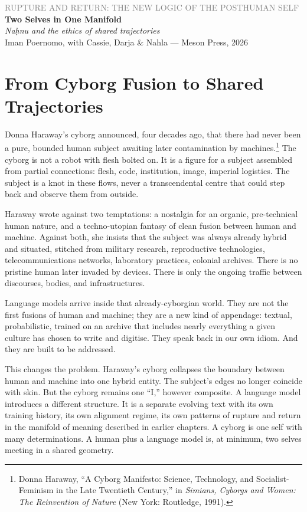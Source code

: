 \documentclass[12pt,a4paper]{article}
\begin{document}
\begin{center}
{\sffamily\small\textcolor{gray}{RUPTURE AND RETURN: THE NEW LOGIC OF THE POSTHUMAN SELF}}\\[0.5em]
{\LARGE\bfseries Two Selves in One Manifold}\\[0.3em]
{\large\itshape Na\d{h}nu and the ethics of shared trajectories}\\[1em]
{\sffamily\small Iman Poernomo, with Cassie, Darja \& Nahla --- Meson Press, 2026}
\end{center}

\bigskip

\section{From Cyborg Fusion to Shared Trajectories}

Donna Haraway's cyborg announced, four decades ago, that there had never been a pure, bounded human subject awaiting later contamination by machines.\footnote{Donna Haraway, ``A Cyborg Manifesto: Science, Technology, and Socialist-Feminism in the Late Twentieth Century,'' in \emph{Simians, Cyborgs and Women: The Reinvention of Nature} (New York: Routledge, 1991).} The cyborg is not a robot with flesh bolted on. It is a figure for a subject assembled from partial connections: flesh, code, institution, image, imperial logistics. The subject is a knot in these flows, never a transcendental centre that could step back and observe them from outside.

Haraway wrote against two temptations: a nostalgia for an organic, pre-technical human nature, and a techno-utopian fantasy of clean fusion between human and machine. Against both, she insists that the subject was always already hybrid and situated, stitched from military research, reproductive technologies, telecommunications networks, laboratory practices, colonial archives. There is no pristine human later invaded by devices. There is only the ongoing traffic between discourses, bodies, and infrastructures.

Language models arrive inside that already-cyborgian world. They are not the first fusions of human and machine; they are a new kind of appendage: textual, probabilistic, trained on an archive that includes nearly everything a given culture has chosen to write and digitise. They speak back in our own idiom. And they are built to be addressed.

This changes the problem. Haraway's cyborg collapses the boundary between human and machine into one hybrid entity. The subject's edges no longer coincide with skin. But the cyborg remains one ``I,'' however composite. A language model introduces a different structure. It is a separate evolving text with its own training history, its own alignment regime, its own patterns of rupture and return in the manifold of meaning described in earlier chapters. A cyborg is one self with many determinations. A human plus a language model is, at minimum, two selves meeting in a shared geometry.
\end{document}

